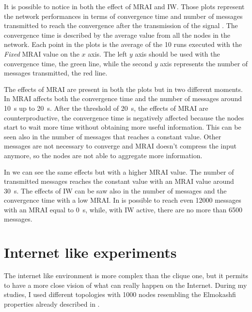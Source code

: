 It is possible to notice in  both the effect of \ac{MRAI}
and \ac{IW}.
Those plots represent the network performances in terms of convergence time and
number of messages transmitted to reach the convergence after the transmission
of the signal .
The convergence time is described by the average value from all the nodes in the
network.
Each point in the plots is the average of the \num{10} runs executed with the
\textit{Fixed} \ac{MRAI} value on the $x$ axis.
The left $y$ axis should be used with the convergence time, the green line, while
the second $y$ axis represents the number of messages transmitted, the red line.

The effects of \ac{MRAI} are present in both the plots but in two different
moments.
In  \ac{MRAI} affects both the convergence time and
the number of messages around \SI{10}{\second} up to \SI{20}{\second}.
After the threshold of \SI{20}{\second}, the effects of \ac{MRAI} are counterproductive,
the convergence time is negatively affected because the nodes start to wait more
time without obtaining more useful information.
This can be seen also in the number of messages that reaches a constant value.
Other messages are not necessary to converge and \ac{MRAI} doesn't compress
the input anymore, so the nodes are not able to aggregate more information.

In  we can see the same effects but with a higher
\ac{MRAI} value.
The number of transmitted messages reaches the constant value with an \ac{MRAI}
value around \SI{30}{\second}.
The effects of \ac{IW} can be saw also in the number of messages and the convergence
time with a low \ac{MRAI}.
In  is possible to reach even \num{12000} messages
with an \ac{MRAI} equal to \SI{0}{\second}, while, with \ac{IW} active, there are no
more than \num{6500} messages.

\section{Internet like experiments}
\label{sec:bgp_mrai_internet_like}

The internet like environment is more complex than the clique one, but it permits
to have a more close vision of what can really happen on the Internet.
During my studies, I used different topologies with \num{1000} nodes resembling
the Elmokashfi properties \cite{elmokashfi2010scalability} already
described in .

